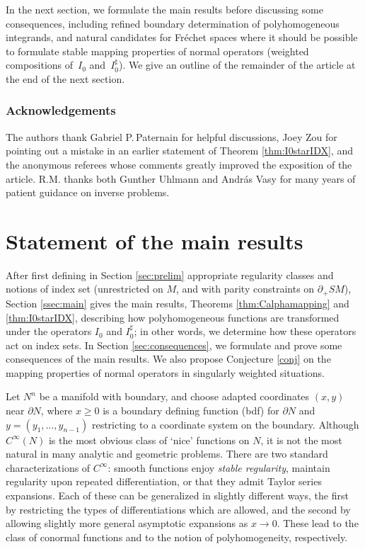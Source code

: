 \documentclass[JEP,XML,SOM,Unicode,NoFloatCountersInSection, NoEqCountersInSection,published]{cedram}
\theoremstyle{plain}
\theoremstyle{definition}
\theoremstyle{remark}
\newcommand{\adj}{I_0^\sharp}
\newcommand{\del}{\partial}
\begin{document}
In the next section, we formulate the main results before discussing some consequences, including refined boundary determination of polyhomogeneous integrands, and natural candidates for Fréchet spaces where it should be possible to formulate stable mapping properties of normal operators (\ie weighted compositions of~$I_0$ and~$\adj$). We give an outline of the remainder of the article at the end of the next section.

\subsubsection*{Acknowledgements} The authors thank Gabriel P.\,Paternain for helpful discussions, Joey Zou for pointing out a mistake in an earlier statement of Theorem \ref{thm:I0starIDX}, and the anonymous referees whose comments greatly improved the exposition of the article. R.M. thanks both Gunther Uhlmann and András Vasy for many years of patient guidance on inverse problems.

\section{Statement of the main results} \label{sec:main}

After first defining in Section \ref{sec:prelim} appropriate regularity classes and notions of index set (unrestricted on $M$, and with parity constraints on $\partial_+ SM$), Section \ref{ssec:main} gives the main results, Theorems \ref{thm:Calphamapping} and \ref{thm:I0starIDX}, describing how polyhomogeneous functions are transformed under the operators $I_0$ and $\adj $; in other words, we determine how these operators act on index sets. In Section \ref{sec:consequences}, we formulate and prove some consequences of the main results. We also propose Conjecture \ref{conj} on the mapping properties of normal operators in singularly weighted situations.

 \label{sec:prelim}

Let $N^n$ be a manifold with boundary, and choose adapted coordinates $(x,y)$ near $\partial N$, where $x \geq 0$ is a boundary defining function (bdf) for $\del N$ and $y = (y_1, \dots, y_{n-1})$ restricting to a coordinate system on the boundary. Although $C^\infty(N)$ is the most obvious class of `nice' functions on $N$, it is not the most natural in many analytic and geometric problems. There are two standard characterizations of $C^\infty$: smooth functions enjoy {\it stable regularity}, \ie maintain regularity upon repeated differentiation, or that they admit Taylor series expansions. Each of these can be generalized in slightly different ways, the first by restricting the types of differentiations which are allowed, and the second by allowing slightly more general asymptotic expansions as $x \to 0$. These lead to the class of conormal functions and to the notion of polyhomogeneity, respectively.
\end{document}
